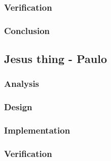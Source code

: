 \subsubsection{Verification}
%
\subsubsection{Conclusion}
\subsection{Jesus thing - Paulo}
%
\subsubsection{Analysis}
%
%
\subsubsection{Design}
%
%
\subsubsection{Implementation}
%
%
\subsubsection{Verification}
%
